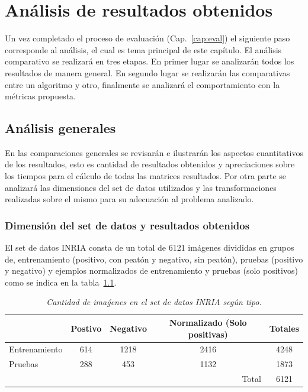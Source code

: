 
\chapter{Análisis de resultados obtenidos}
\label{cap:analisis}

Un vez completado el proceso de evaluación (Cap.~\ref{cap:eval}) el siguiente paso corresponde al análisis, el cual es tema principal de este capítulo. El análisis comparativo se realizará en tres etapas. En primer lugar se analizarán todos los resultados de manera general. En segundo lugar se realizarán las comparativas entre un algoritmo y otro, finalmente se analizará el comportamiento con la métricas propuesta. 


\section{Análisis generales}
\label{analisis:compgeneral}

En las comparaciones generales se revisarán e ilustrarán los aspectos cuantitativos de los resultados, esto es cantidad de resultados obtenidos y apreciaciones sobre los tiempos para el cálculo de todas las matrices resultados. Por otra parte se analizará las dimensiones del set de datos utilizados y las transformaciones realizadas sobre el mismo para su adecuación al problema analizado. 

\subsection{Dimensión del set de datos y resultados obtenidos}

El set de datos INRIA consta de un total de 6121 imágenes divididas en grupos de, entrenamiento (positivo, con peatón y negativo, sin peatón),  pruebas (positivo y negativo) y ejemplos normalizados de entrenamiento y pruebas (solo positivos) como se indica en la tabla~\ref{tab:inria}.

 \begin{table}[H]
 \centering
  \caption{\em Cantidad de imaǵenes en el set de datos INRIA según tipo.}  
  \label{tab:inria}
\begin{tabular}{lcc|c|c|}
\cline{2-5}
\multicolumn{1}{l|}{}               & \multicolumn{1}{c|}{Postivo} & Negativo              & Normalizado (Solo positivas) & Totales \\ \hline
\multicolumn{1}{|l|}{Entrenamiento} & \multicolumn{1}{c|}{614}     & 1218                  & 2416                         & 4248    \\ \hline
\multicolumn{1}{|l|}{Pruebas}       & \multicolumn{1}{c|}{288}     & 453                   & 1132                         & 1873    \\ \hline
                                    & \multicolumn{1}{l}{}         & \multicolumn{1}{l|}{} & \multicolumn{1}{r|}{Total}   & 6121    \\ \cline{4-5} 
\end{tabular}
\end{table}

